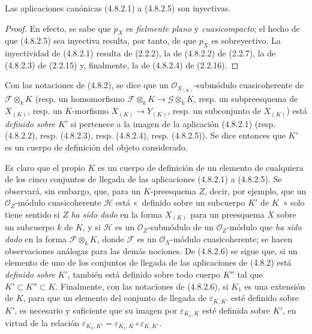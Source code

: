 
\begin{proposition}[4.8.3]
\label{IV.2.4.8.3-fr}
Las aplicaciones canónicas \textup{(4.8.2.1)} a \textup{(4.8.2.5)} son inyectivas.
\end{proposition}

\begin{proof}
En efecto, se sabe que $p_X$ es \emph{fielmente plano} y \emph{cuasicompacto}; el hecho de que
(4.8.2.5) sea inyectiva resulta, por tanto, de que $p_X$ es sobreyectivo.
La inyectividad de (4.8.2.1) resulta de (2.2.2), la de (4.8.2.2) de (2.2.7),
la de (4.8.2.3) de (2.2.15) y, finalmente, la de (4.8.2.4) de (2.2.16).
\end{proof}

\begin{definition}[4.8.4]
\label{IV.2.4.8.4-fr}
Con las notaciones de \textup{(4.8.2)}, se dice que un
$\mathcal O_{X_{(K)}}$-submódulo cuasicoherente de
$\mathscr F\otimes_kK$ \textup{(resp.} un homomorfismo
$\mathscr F\otimes_kK\to\mathscr G\otimes_kK$, \textup{resp.} un subpreesquema de
$X_{(K)}$, \textup{resp.} un $K$-morfismo $X_{(K)}\to Y_{(K)}$, \textup{resp.} un
subconjunto de $X_{(K)}$\textup{)} está \emph{definido sobre $K'$} si pertenece a
la imagen de la aplicación \textup{(4.8.2.1) (resp. (4.8.2.2), resp. (4.8.2.3), resp.
(4.8.2.4), resp. (4.8.2.5))}. Se dice entonces que $K'$ es un cuerpo de
definición del objeto considerado.
\end{definition}

Es claro que el propio $K$ es un cuerpo de definición de un elemento de
cualquiera de los cinco conjuntos de llegada de las aplicaciones (4.8.2.1) a
(4.8.2.5). Se observará, sin embargo, que, para un $K$-preesquema $Z$, decir,
por ejemplo, que un $\mathcal O_Z$-módulo cuasicoherente $\mathscr H$ está
«~definido sobre un subcuerpo $K'$ de $K$~» solo tiene sentido si $Z$
\emph{ha sido dado} en la forma $X_{(K)}$ para un preesquema $X$ sobre un
subcuerpo $k$ de $K$, y si $\mathscr H$ es un $\mathcal O_Z$-submódulo de un
$\mathcal O_Z$-módulo que \emph{ha sido dado} en la forma
$\mathscr F\otimes_kK$, donde $\mathscr F$ es un $\mathcal O_X$-módulo
cuasicoherente; se hacen observaciones análogas para las demás nociones. De
(4.8.2.6) se sigue que, si un elemento de uno de los conjuntos de llegada de
las aplicaciones de (4.8.2) está \emph{definido sobre} $K'$, también está definido
sobre todo cuerpo $K''$ tal que $K'\subset K''\subset K$. Finalmente, con las
notaciones de (4.8.2.6), si $K_1$ es una extensión de $K$, para que un elemento
del conjunto de llegada de $\varepsilon_{K,K'}$ esté definido sobre $K'$, es
necesario y suficiente que su imagen por $\varepsilon_{K_1,K}$ esté definida
sobre $K'$, en virtud de la relación
$\varepsilon_{K_1,K'}=\varepsilon_{K_1,K}\circ\varepsilon_{K,K'}$.
